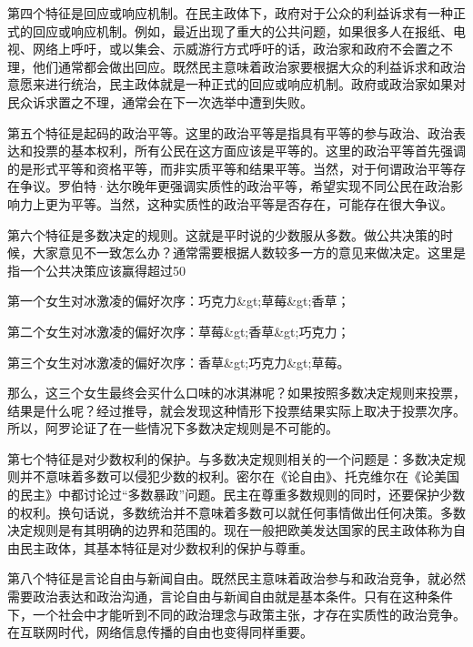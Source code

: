 第四个特征是回应或响应机制。在民主政体下，政府对于公众的利益诉求有一种正式的回应或响应机制。例如，最近出现了重大的公共问题，如果很多人在报纸、电视、网络上呼吁，或以集会、示威游行方式呼吁的话，政治家和政府不会置之不理，他们通常都会做出回应。既然民主意味着政治家要根据大众的利益诉求和政治意愿来进行统治，民主政体就是一种正式的回应或响应机制。政府或政治家如果对民众诉求置之不理，通常会在下一次选举中遭到失败。

第五个特征是起码的政治平等。这里的政治平等是指具有平等的参与政治、政治表达和投票的基本权利，所有公民在这方面应该是平等的。这里的政治平等首先强调的是形式平等和资格平等，而非实质平等和结果平等。当然，对于何谓政治平等存在争议。罗伯特·达尔晚年更强调实质性的政治平等，希望实现不同公民在政治影响力上更为平等。当然，这种实质性的政治平等是否存在，可能存在很大争议。

第六个特征是多数决定的规则。这就是平时说的少数服从多数。做公共决策的时候，大家意见不一致怎么办？通常需要根据人数较多一方的意见来做决定。这里是指一个公共决策应该赢得超过50%

第一个女生对冰激凌的偏好次序：巧克力&gt;草莓&gt;香草；

第二个女生对冰激凌的偏好次序：草莓&gt;香草&gt;巧克力；

第三个女生对冰激凌的偏好次序：香草&gt;巧克力&gt;草莓。

那么，这三个女生最终会买什么口味的冰淇淋呢？如果按照多数决定规则来投票，结果是什么呢？经过推导，就会发现这种情形下投票结果实际上取决于投票次序。所以，阿罗论证了在一些情况下多数决定规则是不可能的。

第七个特征是对少数权利的保护。与多数决定规则相关的一个问题是：多数决定规则并不意味着多数可以侵犯少数的权利。密尔在《论自由》、托克维尔在《论美国的民主》中都讨论过“多数暴政”问题。民主在尊重多数规则的同时，还要保护少数的权利。换句话说，多数统治并不意味着多数可以就任何事情做出任何决策。多数决定规则是有其明确的边界和范围的。现在一般把欧美发达国家的民主政体称为自由民主政体，其基本特征是对少数权利的保护与尊重。

第八个特征是言论自由与新闻自由。既然民主意味着政治参与和政治竞争，就必然需要政治表达和政治沟通，言论自由与新闻自由就是基本条件。只有在这种条件下，一个社会中才能听到不同的政治理念与政策主张，才存在实质性的政治竞争。在互联网时代，网络信息传播的自由也变得同样重要。


